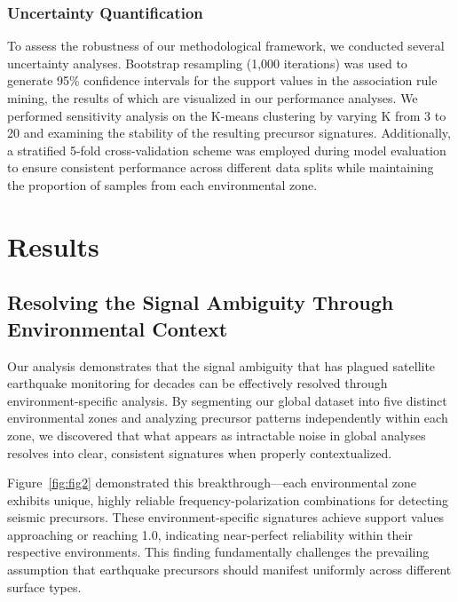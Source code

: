 \documentclass[preprint,review,12pt,authoryear]{elsarticle}
\begin{document}
\subsubsection{Uncertainty Quantification}\label{sec:uncertainty}
To assess the robustness of our methodological framework, we conducted several uncertainty analyses. Bootstrap resampling (1,000 iterations) was used to generate 95\% confidence intervals for the support values in the association rule mining, the results of which are visualized in our performance analyses. We performed sensitivity analysis on the K-means clustering by varying K from 3 to 20 and examining the stability of the resulting precursor signatures. Additionally, a stratified 5-fold cross-validation scheme was employed during model evaluation to ensure consistent performance across different data splits while maintaining the proportion of samples from each environmental zone.

\section{Results}
\subsection{Resolving the Signal Ambiguity Through Environmental Context}
Our analysis demonstrates that the signal ambiguity that has plagued satellite earthquake monitoring for decades can be effectively resolved through environment-specific analysis. By segmenting our global dataset into five distinct environmental zones and analyzing precursor patterns independently within each zone, we discovered that what appears as intractable noise in global analyses resolves into clear, consistent signatures when properly contextualized.

Figure~\ref{fig:fig2} demonstrated this breakthrough---each environmental zone exhibits unique, highly reliable frequency-polarization combinations for detecting seismic precursors. These environment-specific signatures achieve support values approaching or reaching 1.0, indicating near-perfect reliability within their respective environments. This finding fundamentally challenges the prevailing assumption that earthquake precursors should manifest uniformly across different surface types.
\end{document}
